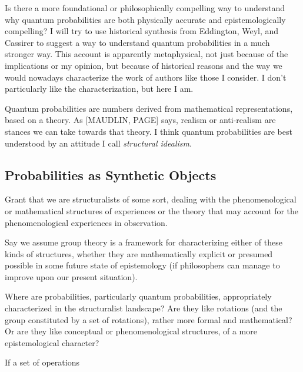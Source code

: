 Is there a more foundational or philosophically compelling way to understand why quantum probabilities are both physically accurate and epistemologically compelling?  I will try to use historical synthesis from Eddington, Weyl, and Cassirer to suggest a way to understand quantum probabilities in a much stronger way.  This account is apparently metaphysical, not just because of the implications or my opinion, but because of historical reasons and the way we would nowadays characterize the work of authors like those I consider.  I don't particularly like the characterization, but here I am.





Quantum probabilities are numbers derived from mathematical representations, based on a theory.  As [MAUDLIN, PAGE] says, realism or anti-realism are stances we can take towards that theory.  I think quantum probabilities are best understood by an attitude I call \emph{structural idealism}.  

\subsection{Probabilities as Synthetic Objects}

Grant that we are structuralists of some sort, dealing with the phenomenological or mathematical structures of experiences or the theory that may account for the phenomenological experiences in observation.  

Say we assume group theory is a framework for characterizing either of these kinds of structures, whether they are mathematically explicit or presumed possible in some future state of epistemology (if philosophers can manage to improve upon our present situation).

Where are probabilities, particularly quantum probabilities, appropriately characterized in the structuralist landscape?  Are they like rotations (and the group constituted by a set of rotations), rather more formal and mathematical?  Or are they like conceptual or phenomenological structures, of a more epistemological character?  

If a set of operations 






